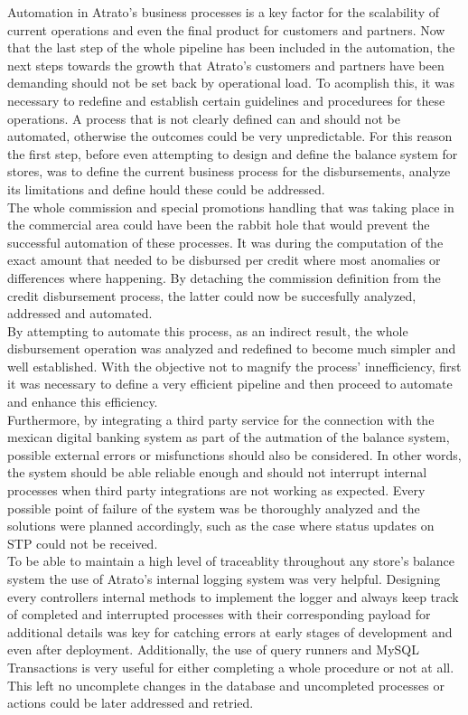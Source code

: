 Automation in Atrato's business processes is a key factor for the scalability of current operations and even the final product for customers and partners. Now that the last step of the whole pipeline has been included in the automation, the next steps towards the growth that Atrato's customers and partners have been demanding should not be set back by operational load. To acomplish this, it was necessary to redefine and establish certain guidelines and procedurees for these operations. A process that is not clearly defined can and should not be automated, otherwise the outcomes could be very unpredictable. For this reason the first step, before even attempting to design and define the balance system for stores, was to define the current business process for the disbursements, analyze its limitations and define hould these could be addressed.\\

The whole commission and special promotions handling that was taking place in the commercial area could have been the rabbit hole that would prevent the successful automation of these processes. It was during the computation of the exact amount that needed to be disbursed per credit where most anomalies or differences where happening. By detaching the commission definition from the credit disbursement process, the latter could now be succesfully analyzed, addressed and automated.\\

By attempting to automate this process, as an indirect result, the whole disbursement operation was analyzed and redefined to become much simpler and well established. With the objective not to magnify the process' innefficiency, first it was necessary to define a very efficient pipeline and then proceed to automate and enhance this efficiency.\\

Furthermore, by integrating a third party service for the connection with the mexican digital banking system as part of the autmation of the balance system, possible external errors or misfunctions should also be considered. In other words, the system should be able reliable enough and should not interrupt internal processes when third party integrations are not working as expected. Every possible point of failure of the system was be thoroughly analyzed and the solutions were planned accordingly, such as the case where status updates on STP could not be received.\\

To be able to maintain a high level of traceablity throughout any store's balance system the use of Atrato's internal logging system was very helpful. Designing every controllers internal methods to implement the logger and always keep track of completed and interrupted processes with their corresponding payload for additional details was key for catching errors at early stages of development and even after deployment. Additionally, the use of query runners and MySQL Transactions is very useful for either completing a whole procedure or not at all. This left no uncomplete changes in the database and uncompleted processes or actions could be later addressed and retried.\\

